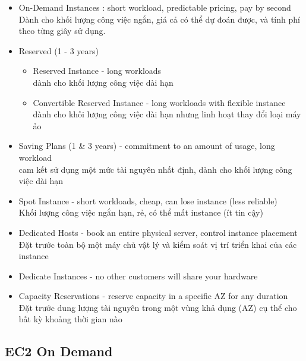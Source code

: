 \begin{itemize}
	\item On-Demand Instances : short workload, predictable pricing, pay by second \\  Dành cho khối lượng công việc ngắn, giá cả có thể dự đoán được, và tính phí theo từng giây sử dụng.
	\item Reserved (1 - 3 years)
	\begin{itemize}
		\item Reserved Instance  - long workloads \\  dành cho khối lượng công việc dài hạn
		\item  Convertible Reserved Instance - long workloads with flexible instance  \\ dành cho khối lượng công việc dài hạn nhưng linh hoạt thay đổi loại máy ảo
	\end{itemize}
	\item Saving Plans (1 \& 3 years) - commitment to an amount of usage, long workload \\cam kết sử dụng một mức tài nguyên nhất định, dành cho khối lượng công việc dài hạn
	\item Spot Instance - short workloads, cheap, can lose instance (less reliable) \\ Khối lượng công việc ngắn hạn, rẻ, có thể mất instance (ít tin cậy)
	\item Dedicated Hosts - book an entire physical server, control instance placement \\Đặt trước toàn bộ một máy chủ vật lý và kiểm soát vị trí triển khai của các instance
	\item Dedicate Instances - no other customers will share your hardware
	\item Capacity Reservations - reserve capacity in a specific AZ for any duration \\ Đặt trước dung lượng tài nguyên trong một vùng khả dụng (AZ) cụ thể cho bất kỳ khoảng thời gian nào
	
\end{itemize}


\subsection{EC2 On Demand}

